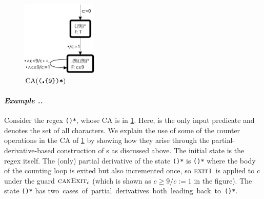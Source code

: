 \documentclass[acmsmall,screen]{acmart}
\begin{document}
\begin{figure}
    \vspace*{-3mm}
\hspace*{2mm}
\begin{minipage}{29mm}
    \hspace*{-2mm}
    \includegraphics[width=3.6cm,keepaspectratio]{figures/dot9star_TB.pdf}
  \vspace*{-6mm}
\end{minipage}
  \caption{\label{fig:dot9star}$\CA(\regex{(\DOT\leftbrace9\rightbrace)*})$}%
\end{figure}
%
\paragraph{\it Example ..\,}
\!Consider the regex
\texttt{(\DOT{}\rightbrace)*},
whose CA is in
\cref{fig:dot9star}. 
Here,  {\DOT} is the only input
predicate and denotes the set of all characters.
%
We explain the use of some of the counter operations in the CA of
\cref{fig:dot9star} 
by showing how they arise through the
partial-derivative-based construction of {\CA}s as discussed above. 
%
The initial
state is the regex itself. The (only) partial derivative of the state
\texttt{(\DOT{}\rightbrace)*} is
\texttt{\DOT{}\rightbrace(\DOT{}\rightbrace)*} where the body
of the counting loop is exited but also incremented once, so $\textsc{exit1}_{{}}$ is
applied to $c$ under the guard $\textsc{canExit}_{c}$ (which is shown as $c\geq
9/ c{:=}1$ in the figure). 
 The state
\texttt{\DOT{}\rightbrace(\DOT{}\rightbrace)*} has \mbox{two cases
of partial derivatives both leading back to
\texttt{\DOT{}\rightbrace(\DOT{}\rightbrace)*}. }
\end{document}
